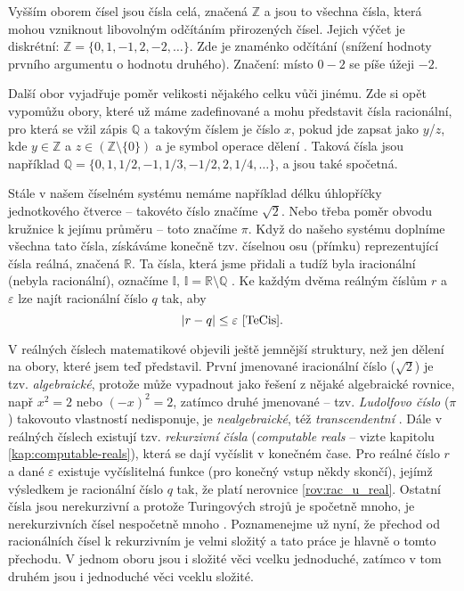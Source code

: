 Vyšším oborem čísel jsou čísla celá, značená $\mathbb{Z}$ a jsou to všechna čísla, která mohou vzniknout libovolným odčítáním přirozených čísel. Jejich výčet je diskrétní: $\mathbb{Z} = \{0, 1, -1, 2, -2, \ldots\}$\cite{OEIS:integer}. Zde \uv{$-$} je znaménko odčítání (snížení hodnoty prvního argumentu o hodnotu druhého). Značení: místo $0-2$ se píše úžeji $-2$.

Další obor vyjadřuje poměr velikosti nějakého celku vůči jinému. Zde si opět vypomůžu obory, které už máme zadefinované a mohu představit čísla racionální, pro která se vžil zápis $\mathbb{Q}$ a takovým číslem je číslo $x$, pokud jde zapsat jako $y$/$z$, kde $y \in \mathbb{Z}$ a $z \in \left( \mathbb{Z} \setminus \{0\} \right)$ a \uv{$/$} je symbol operace dělení \cite{SPIVAK:calculus}. Taková čísla jsou například $\mathbb{Q} = \{0, 1, 1/2, -1, 1/3, -1/2, 2, 1/4, \ldots \}$, a jsou také spočetná.

Stále v našem číselném systému nemáme například délku úhlopříčky jednotkového čtverce -- takovéto číslo značíme $\sqrt{2}$. Nebo třeba poměr obvodu kružnice k jejímu průměru -- toto značíme $\pi$. Když do našeho systému doplníme všechna tato čísla, získáváme konečně tzv. číselnou osu (přímku) reprezentující čísla reálná, značená $\mathbb{R}$. Ta čísla, která jsme přidali a tudíž byla iracionální (nebyla racionální), označíme $\mathbb{I}$, $\mathbb{I} = \mathbb{R} \setminus \mathbb{Q}$ \cite{tabulky}. Ke každým dvěma reálným číslům $r$ a $\varepsilon$ lze najít racionální číslo $q$ tak, aby
\begin{equation}\label{rov:rac_u_real}
|r-q|\leq\varepsilon \text{~\cite{TeCis}}.
\end{equation}

V reálných číslech matematikové objevili ještě jemnější struktury, než jen dělení na obory, které jsem teď představil. První jmenované iracionální číslo ($\sqrt{2}$) je tzv. \textit{algebraické}, protože může vypadnout jako řešení z nějaké algebraické rovnice, např $x ^ 2 = 2$ nebo $(-x) ^ 2 = 2$, zatímco druhé jmenované -- tzv. \textit{Ludolfovo číslo} ($\pi$) takovouto vlastností nedisponuje, je \textit{nealgebraické}, též \textit{transcendentní} \cite{TeMno}. Dále v reálných číslech existují tzv. \textit{rekurzivní čísla} (\textit{computable reals} -- vizte kapitolu \ref{kap:computable-reals}), která se dají vyčíslit v konečném čase. Pro reálné číslo $r$ a dané $\varepsilon$ existuje vyčíslitelná funkce (pro konečný vstup někdy skončí), jejímž výsledkem je racionální číslo $q$ tak, že platí nerovnice \ref{rov:rac_u_real}. Ostatní čísla jsou nerekurzivní a protože Turingových strojů je spočetně mnoho, je nerekurzivních čísel nespočetně mnoho \cite{wiki:CompN}. Poznamenejme už nyní, že přechod od racionálních čísel k rekurzivním je velmi složitý a tato práce je hlavně o tomto přechodu. V jednom oboru jsou i složité věci vcelku jednoduché, zatímco v tom druhém jsou i jednoduché věci vceklu složité.

